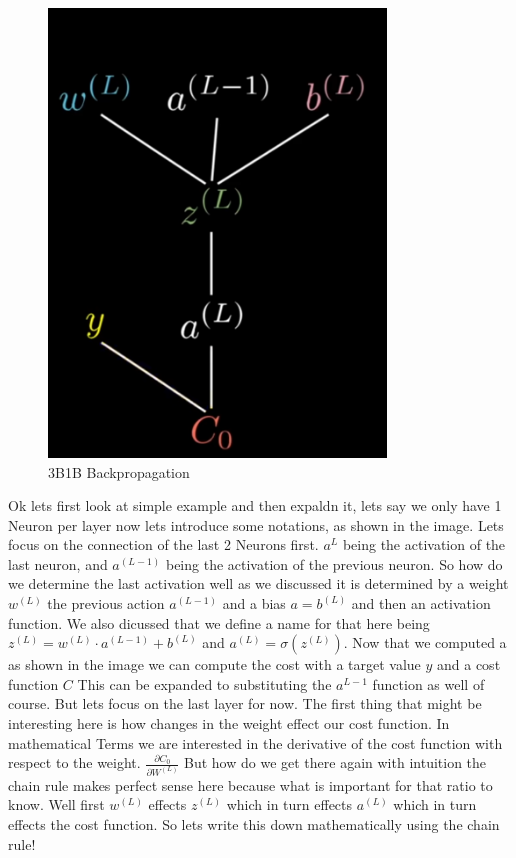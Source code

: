 \documentclass[a4paper]{article}
\begin{document}
\begin{figure}
    \centering
    \includegraphics[width=0.8\textwidth]{images/3b1b_backpropagation.png}
    \caption{3B1B Backpropagation}
    \label{fig:Backpropagation}
\end{figure}

Ok lets first look at simple example and then expaldn it, lets say we only have 1 Neuron per layer now lets introduce some notations, as shown in the image. Lets focus on the connection of the last 2 Neurons first. $a^{L}$ being the activation of the last neuron, and $a^{(L-1)}$ being the activation of the previous neuron. So how do we determine the last activation well as we discussed it is determined by a weight $w^{(L)}$ the previous action $a^{(L-1)}$ and a bias $a=b^{(L)}$ and then an activation function. We also dicussed that we define a name for that here being $z^{(L)} = w^{(L)} \cdot a^{(L-1)} + b^{(L)}$ and $a^{(L)} = \sigma(z^{(L)})$. 
Now that we computed a as shown in the image we can compute the cost with a target value $y$ and a cost function $C$ This can be expanded to substituting the $a^{L-1}$ function as well of course. But lets focus on the last layer for now. The first thing that might be interesting here is how changes in the weight effect our cost function. In mathematical Terms we are 
interested in the derivative of the cost function with respect to the weight. $ \frac{\partial C_{0}}{\partial W^{(L)}}$ But how do we get there again with intuition the chain rule makes perfect sense here because what is important for that ratio to know. Well first $w^{(L)}$ effects $z^{(L)}$ which in turn effects $a^{(L)}$ which in turn effects the cost function. 
So lets write this down mathematically using the chain rule! 
\end{document}
